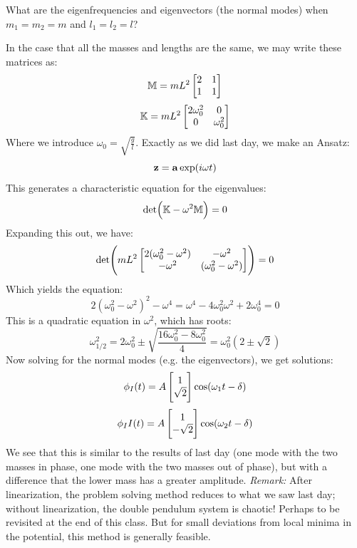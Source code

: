 \begin{p}
What are the eigenfrequencies and eigenvectors (the normal modes) when $m_1 = m_2 = m$ and $l_1 = l_2 = l$?
\end{p}
\begin{s}
In the case that all the masses and lengths are the same, we may write these matrices as:
\[\mathbb{M} = mL^2\begin{bmatrix}2 & 1 \\ 1 & 1\end{bmatrix}\]
\[\mathbb{K} = mL^2\begin{bmatrix}2\omega_0^2 & 0 \\ 0 & \omega_0^2\end{bmatrix}\]
Where we introduce $\omega_0 = \sqrt{\frac{g}{l}}$. Exactly as we did last day, we make an Ansatz:
\[\mathbf{z} = \mathbf{a}\exp(i\omega t)\]
This generates a characteristic equation for the eigenvalues:
\[\det(\mathbb{K} - \omega^2\mathbb{M}) = 0\]
Expanding this out, we have:
\[\det(mL^2\begin{bmatrix}2(\omega_0^2 -\omega^2) & -\omega^2 \\ -\omega^2 & (\omega_0^2 - \omega^2)\end{bmatrix}) = 0\]
Which yields the equation:
\[2(\omega_0^2 - \omega^2)^2 - \omega^4 = \omega^4 - 4\omega_0^2\omega^2 + 2\omega_0^4 = 0\]
This is a quadratic equation in $\omega^2$, which has roots:
\[\omega_{1/2}^2 = 2\omega_0^2 \pm\sqrt{\frac{16\omega_0^2 - 8\omega_0^2}{4}} = \omega_0^2\left(2\pm \sqrt{2}\right)\]
Now solving for the normal modes (e.g. the eigenvectors), we get solutions:
\[\phi_I(t) = A\begin{bmatrix}1 \\ \sqrt{2}\end{bmatrix}\cos(\omega_1 t - \delta)\]
\[\phi_II(t) = A\begin{bmatrix}1 \\ -\sqrt{2}\end{bmatrix}\cos(\omega_2 t - \delta)\]
We see that this is similar to the results of last day (one mode with the two masses in phase, one mode with the two masses out of phase), but with a difference that the lower mass has a greater amplitude.
\newline\textit{Remark:} After linearization, the problem solving method reduces to what we saw last day; without linearization, the double pendulum system is chaotic! Perhaps to be revisited at the end of this class. But for small deviations from local minima in the potential, this method is generally feasible.
\end{s}